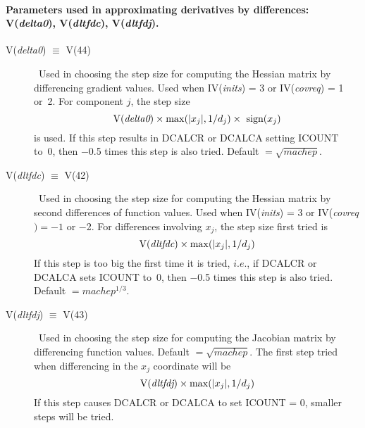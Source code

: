 \documentclass[twoside]{MATH77}
\begin{document}
\paragraph{Parameters used in approximating derivatives by differences:
V({\em delta0}), V({\em dltfdc}), V({\em dltfdj}).}
\begin{description}
\item[V({\em delta0}) $\equiv $ V(44)]  \ Used in choosing the step size for
computing the Hessian matrix by differencing gradient values. Used when
IV({\em inits}) = 3 or IV({\em covreq}) = 1 or~2. For component $j$, the step size
\begin{equation*}
\text{V({\em delta0})}\times \max (|x_j|,1/d_j)\times \text{ sign}(x_j)
\end{equation*}
is used. If this step results in DCALCR or DCALCA setting ICOUNT to~0, then
$-$0.5 times this step is also tried. Default $=\sqrt {machep}$.

\item[V({\em dltfdc}) $\equiv $ V(42)]  \ Used in choosing the step size for
computing the Hessian matrix by second differences of function values. Used
when IV({\em inits}) = 3 or IV({\em covreq}$)=-1$ or $-$2. For differences involving $%
x_j $, the step size first tried is
\begin{equation*}
\text{V({\em dltfdc})}\times \max (|x_j|,1/d_j)
\end{equation*}
If this step is too big the first time it is tried, $i.e.$, if DCALCR or
DCALCA sets ICOUNT to~0, then $-$0.5 times this step is also tried. Default $%
=machep^{1/3}.$

\item[V({\em dltfdj}) $\equiv $ V(43)]  \ Used in choosing the step size for
computing the Jacobian matrix by differencing function values. Default $%
=\sqrt {machep}$. The first step tried when differencing in the $x_j$
coordinate will be
\begin{equation*}
\text{V({\em dltfdj})}\times \max (|x_j|,1/d_j)
\end{equation*}
If this step causes DCALCR or DCALCA to set ICOUNT = 0, smaller steps will
be tried.
\end{description}
\end{document}
